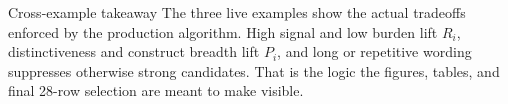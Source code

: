 \documentclass[12pt]{article}
\begin{document}
\begin{psidbox}{Cross-example takeaway}
The three live examples show the actual tradeoffs enforced by the production algorithm. High signal and low burden lift $R_i$, distinctiveness and construct breadth lift $P_i$, and long or repetitive wording suppresses otherwise strong candidates. That is the logic the figures, tables, and final 28-row selection are meant to make visible.
\end{psidbox}
\end{document}
